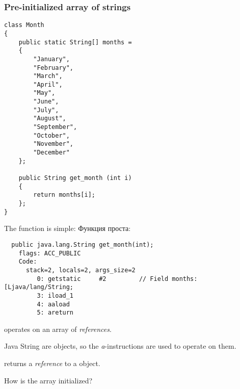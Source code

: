 \subsubsection{Pre-initialized array of strings}
\label{Java_2D_array_month}

\begin{lstlisting}[style=customjava]
class Month
{
	public static String[] months = 
	{
		"January", 
		"February", 
		"March", 
		"April",
		"May",
		"June",
		"July",
		"August",
		"September",
		"October",
		"November",
		"December"
	};

	public String get_month (int i)
	{
		return months[i];
	};
} 
\end{lstlisting}

The  function is simple:
Функция  проста:

\begin{lstlisting}
  public java.lang.String get_month(int);
    flags: ACC_PUBLIC
    Code:
      stack=2, locals=2, args_size=2
         0: getstatic     #2         // Field months:[Ljava/lang/String;
         3: iload_1       
         4: aaload        
         5: areturn       
\end{lstlisting}

 operates on an array of \emph{references}.

Java String are objects, so the \emph{a}-instructions are used to operate on them.

 returns a \emph{reference} to a  object.


How is the  array initialized?


